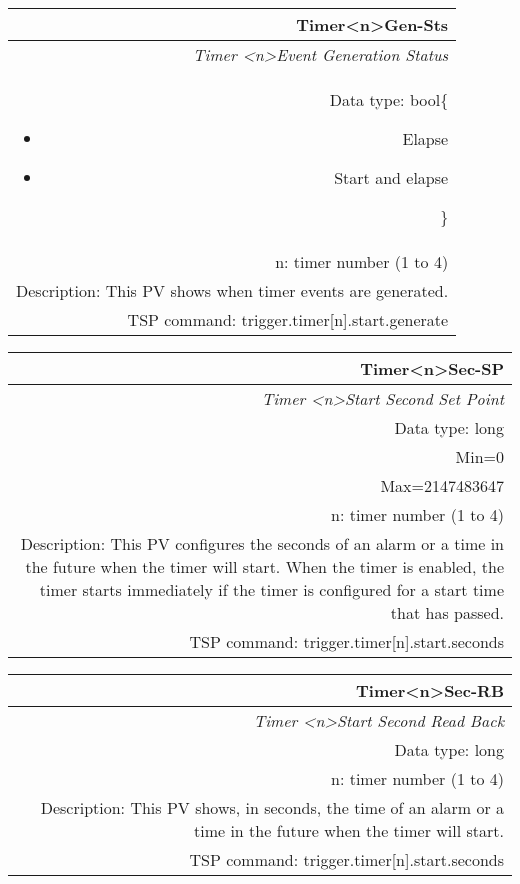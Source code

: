 \documentclass[openany]{article}
\begin{document}
		\begin{tabular}{N}
			\hline
			\bfseries Timer{\textless n\textgreater}Gen-Sts\label{pv:timergen-sts} \\ \hline
			\emph{Timer \textless n\textgreater Event Generation Status} \\
			Data type: bool\{\begin{itemize}[noitemsep]
				\small
				\item[] Elapse
				\item[] Start and elapse
			\end{itemize}\} \\
			n: timer number (1 to 4) \\
			Description: This PV shows when timer events are generated. \\
			TSP command: trigger.timer[n].start.generate
		\end{tabular}

		\begin{tabular}{N}
			\hline
			\bfseries Timer{\textless n\textgreater}Sec-SP\label{pv:timersec-sp} \\ \hline
			\emph{Timer \textless n\textgreater Start Second Set Point} \\
			Data type: long \\
			Min=0 \\ 
			Max=2147483647 \\
			n: timer number (1 to 4) \\
			Description: This PV configures the seconds of an alarm or a time in the future when the timer will start. When the timer is enabled, the timer starts immediately if the timer is configured for a start time that has passed. \\
			TSP command: trigger.timer[n].start.seconds
		\end{tabular}

		\begin{tabular}{N}
			\hline
			\bfseries Timer{\textless n\textgreater}Sec-RB\label{pv:timersec-rb} \\ \hline
			\emph{Timer \textless n\textgreater Start Second Read Back} \\
			Data type: long \\
			n: timer number (1 to 4) \\
			Description: This PV shows, in seconds, the time of an alarm or a time in the future when the timer will start. \\
			TSP command: trigger.timer[n].start.seconds
		\end{tabular}
\end{document}
